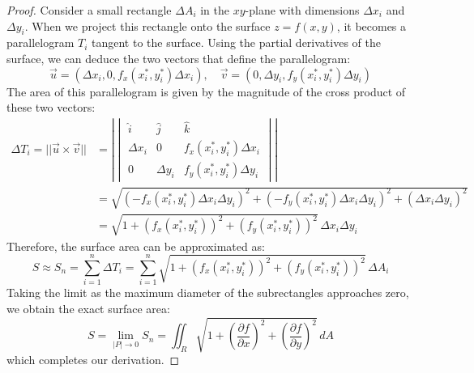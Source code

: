 \documentclass[11pt]{report}
\begin{document}
\begin{proof}
    Consider a small rectangle $\Delta A_i$ in the $xy$-plane with dimensions $\Delta x_i$ and $\Delta y_i$. When we project this rectangle onto the surface $z = f(x,y)$, it becomes a parallelogram $T_i$ tangent to the surface. Using the partial derivatives of the surface, we can deduce the two vectors that define the parallelogram:
    $$
        \vec{u} = \left( \Delta x_i, 0, f_x(x_i^*, y_i^*) \Delta x_i \right), \quad \vec{v} = \left( 0, \Delta y_i, f_y(x_i^*, y_i^*) \Delta y_i \right)
    $$
    The area of this parallelogram is given by the magnitude of the cross product of these two vectors:
    \begin{align*}
        \Delta T_i = ||\vec{u} \times \vec{v}|| &= \left|\begin{vmatrix}
        \hat{i} & \hat{j} & \hat{k} \\
        \Delta x_i & 0 & f_x(x_i^*, y_i^*) \Delta x_i \\
        0 & \Delta y_i & f_y(x_i^*, y_i^*) \Delta y_i
        \end{vmatrix}\right| \\
        &= \sqrt{( -f_x(x_i^*, y_i^*) \Delta x_i \Delta y_i )^2 + ( -f_y(x_i^*, y_i^*) \Delta x_i \Delta y_i )^2 + (\Delta x_i \Delta y_i)^2} \\
        &= \sqrt{1 + (f_x(x_i^*, y_i^*))^2 + (f_y(x_i^*, y_i^*))^2} \, \Delta x_i \Delta y_i
    \end{align*}
    Therefore, the surface area can be approximated as:
    $$
        S \approx S_n = \sum_{i=1}^n \Delta T_i = \sum_{i=1}^n \sqrt{1 + (f_x(x_i^*, y_i^*))^2 + (f_y(x_i^*, y_i^*))^2} \, \Delta A_i
    $$
    Taking the limit as the maximum diameter of the subrectangles approaches zero, we obtain the exact surface area:
    $$
        S = \lim_{|P| \to 0} S_n =\iint_R \sqrt{1 + \left( \frac{\partial f}{\partial x} \right)^2 + \left( \frac{\partial f}{\partial y} \right)^2} \, dA
    $$
    which completes our derivation.
\end{proof}
\end{document}
